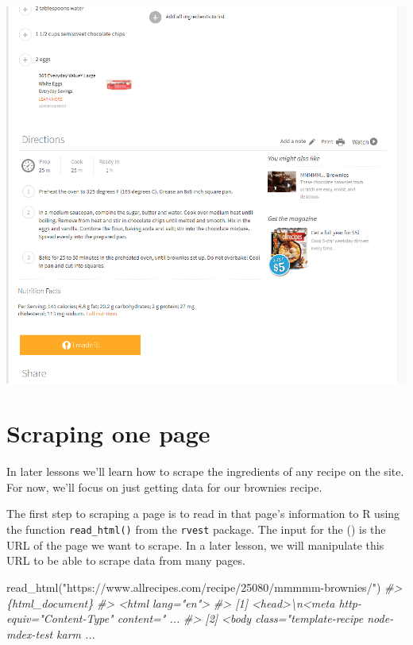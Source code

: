 \documentclass[
]{krantz}
\makeatletter
\newenvironment{Shaded}{\begin{snugshade}}{\end{snugshade}}
\newcommand{\CommentTok}[1]{\textcolor[rgb]{0.37,0.37,0.37}{\textit{#1}}}
\newcommand{\FunctionTok}[1]{\textcolor[rgb]{0,0,0}{#1}}
\newcommand{\NormalTok}[1]{#1}
\newcommand{\StringTok}[1]{\textcolor[rgb]{0.5,0.5,0.5}{#1}}
\newenvironment{kframe}{%
\medskip{}
\setlength{\fboxsep}{.8em}
 \def\at@end@of@kframe{}%
 \ifinner\ifhmode%
  \def\at@end@of@kframe{\end{minipage}}%
  \begin{minipage}{\columnwidth}%
 \fi\fi%
 \def\FrameCommand##1{\hskip\@totalleftmargin \hskip-\fboxsep
 \colorbox{shadecolor}{##1}\hskip-\fboxsep
     \hskip-\linewidth \hskip-\@totalleftmargin \hskip\columnwidth}%
 \MakeFramed {\advance\hsize-\width
   \@totalleftmargin\z@ \linewidth\hsize
   \@setminipage}}%
 {\par\unskip\endMakeFramed%
 \at@end@of@kframe}
\renewenvironment{Shaded}{\begin{kframe}}{\end{kframe}}
\makeatother
\begin{document}
\includegraphics{images/brownies_2.PNG}

\hypertarget{scraping-one-page}{%
\section{Scraping one page}\label{scraping-one-page}}

In later lessons we'll learn how to scrape the ingredients of any recipe on the site. For now, we'll focus on just getting data for our brownies recipe.

The first step to scraping a page is to read in that page's information to R using the function \texttt{read\_html()} from the \texttt{rvest} package. The input for the () is the URL of the page we want to scrape. In a later lesson, we will manipulate this URL to be able to scrape data from many pages.

\begin{Shaded}
\begin{Highlighting}[]
\FunctionTok{read\_html}\NormalTok{(}\StringTok{"https://www.allrecipes.com/recipe/25080/mmmmm{-}brownies/"}\NormalTok{)}
\CommentTok{\#\textgreater{} \{html\_document\}}
\CommentTok{\#\textgreater{} \textless{}html lang="en"\textgreater{}}
\CommentTok{\#\textgreater{} [1] \textless{}head\textgreater{}\textbackslash{}n\textless{}meta http{-}equiv="Content{-}Type" content=" ...}
\CommentTok{\#\textgreater{} [2] \textless{}body class="template{-}recipe node{-} mdex{-}test karm ...}
\end{Highlighting}
\end{Shaded}
\end{document}
